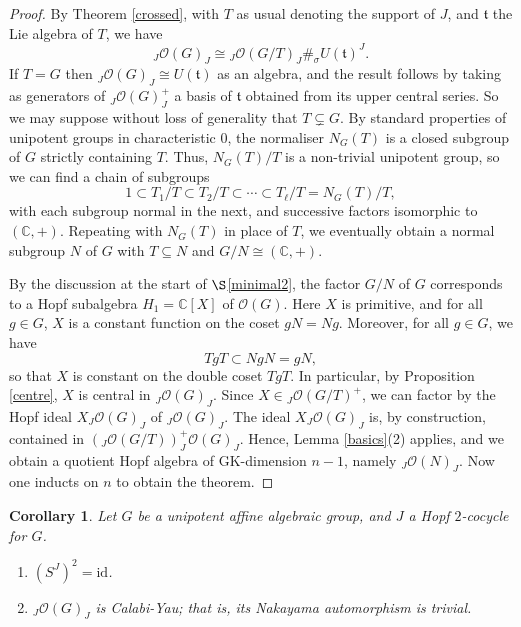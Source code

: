 \documentclass{amsart}
\numberwithin{equation}{section}
\newtheorem{corollary}[theorem]{Corollary}
\theoremstyle{definition}
\begin{document}
\begin{proof} By Theorem \ref{crossed}, with $T$ as usual denoting the support of $J$, and $\mathfrak{t}$ the Lie algebra of $T$, we have
\begin{equation}\label{product} {}_J\mathcal{O}(G)_J \cong {}_J\mathcal{O}(G/T)_J \#_{\sigma} U(\mathfrak{t})^J.
\end{equation}
If $T = G$ then ${}_J\mathcal{O}(G)_J \cong U(\mathfrak{t})$ as an algebra, and the result follows by taking as generators of ${}_J\mathcal{O}(G)_J^+$ a basis of $\mathfrak{t}$ obtained from its upper central series. So we may suppose without loss of generality that $T \subsetneq G$. By standard properties of unipotent groups in characteristic $0$, the normaliser $N_G(T)$ is a closed subgroup of $G$ strictly containing $T$. Thus, $N_G(T)/T$ is a non-trivial unipotent group, so we can find a chain of subgroups
$$ 1 \subset T_1/T \subset T_2/T \subset \cdots \subset T_{\ell}/T = N_G(T)/T,$$
with each subgroup normal in the next, and successive factors isomorphic to $(\mathbb{C},+)$. Repeating with $N_G(T)$ in place of $T$, we eventually obtain a normal subgroup $N$ of $G$ with $T \subseteq N$ and $G/N \cong (\mathbb{C},+)$.

By the discussion at the start of $\S$\ref{minimal2}, the factor $G/N$ of $G$ corresponds to a Hopf subalgebra $H_1 = \mathbb{C}[X]$ of $\mathcal{O}(G)$. Here $X$ is primitive, and for all $g \in G$, $X$ is a constant function on the coset $gN = Ng$. Moreover, for all $g \in G$, we have 
$$ TgT \subset NgN = gN,$$
so that $X$ is constant on the double coset $TgT$. In particular, by Proposition \ref{centre}, $X$ is central in $_J\mathcal{O}(G)_J$. Since $X \in {}_J\mathcal{O}(G/T)^+$, we can factor by the Hopf ideal $X {}_J\mathcal{O}(G)_J$ of ${}_J\mathcal{O}(G)_J$. The ideal $X {}_J\mathcal{O}(G)_J$ is, by construction, contained in $({}_J\mathcal{O}(G/T))^+_J\mathcal{O}(G)_J$. Hence, Lemma \ref{basics}(2) applies, and we obtain a quotient Hopf algebra of GK-dimension $n-1$, namely ${}_J\mathcal{O}(N)_J$. Now one inducts on $n$ to obtain the theorem. 
\end{proof}

\begin{corollary}\label{payoff} 
Let $G$ be a unipotent affine algebraic group, and $J$ a Hopf $2$-cocycle for $G$.
\begin{enumerate}
\item $(S^J)^2 = \mathrm{id}$.
\item ${}_J\mathcal{O}(G)_J$ is Calabi-Yau; that is, its Nakayama automorphism is trivial.
\end{enumerate}
\end{corollary}
\end{document}
